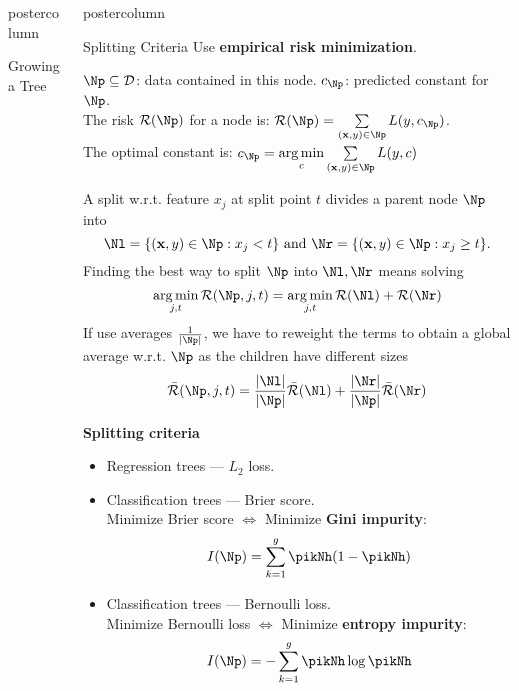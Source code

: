 \documentclass{beamer}
\newlength{\columnheight} %
\begin{document}
\begin{frame}[fragile]{}
\begin{columns}
\begin{column}{.31\textwidth}
\begin{beamercolorbox}[center]{postercolumn}
\begin{minipage}{.98\textwidth}
{\begin{myblock}{Growing a Tree}
\end{myblock}
				}
			\end{minipage}
		\end{beamercolorbox}
	\end{column}
	

\begin{column}{.31\textwidth}
\begin{beamercolorbox}[center]{postercolumn}
\begin{minipage}{.98\textwidth}
\parbox[t][\columnheight]{\textwidth}{
  \begin{myblock}{Splitting Criteria}
    Use \textbf{empirical risk minimization}.

    $\Np \subseteq \D$: data contained in this node. $c_{\Np}$: predicted constant for $\Np$.\\
    The risk $\risk(\Np)$ for a node is:
    $\risk(\Np) = \sum\limits_{(\xv, y) \in \Np} L(y, c_{\Np})$.\\
    The optimal constant is:
    $c_{\Np} = \argminlim_c \sum\limits_{(\xv, y) \in \Np} L(y, c)$

    A split w.r.t. feature $x_j$ at split point $t$ divides a parent node $\Np$ into 
    $$\Nl = \{ (\xv, y) \in \Np: x_j < t \} \text{ and } \Nr = \{ (\xv, y) \in \Np: x_j \geq t \}.$$
    Finding the best way to split $\Np$ into $\Nl, \Nr$ means solving
    $$\argmin_{j, t} \risk(\Np, j, t) = \argmin_{j, t} \risk(\Nl) +  \risk(\Nr)$$
    If use averages $\frac{1}{|\Np|}$, we have to reweight the terms to obtain a global average w.r.t. $\Np$ as the children have different sizes
    $$\bar{\risk}(\Np, j, t) = \frac{|\Nl|}{|\Np|} \bar{\risk}(\Nl) + \frac{|\Nr|}{|\Np|} \bar{\risk}(\Nr)$$

    \begin{codebox}
    \textbf{Splitting criteria}\end{codebox}
    \begin{itemize}[$\bullet$]
    \setlength{\itemindent}{+.3in}
    \item Regression trees --- $L_2$ loss.
    \item Classification trees --- Brier score.\\
    Minimize Brier score $\iff$ Minimize \textbf{Gini impurity}:
    $$I(\Np) = \sum_{k=1}^g \pikNh(1-\pikNh)$$
    \item Classification trees --- Bernoulli loss.\\
    Minimize Bernoulli loss $\iff$ Minimize \textbf{entropy impurity}:
    $$I(\Np) = -\sum_{k=1}^g \pikNh \log \pikNh$$
    \end{itemize}


\end{myblock}}
\end{minipage}
\end{beamercolorbox}
\end{column}
\end{columns}
\end{frame}
\end{document}
